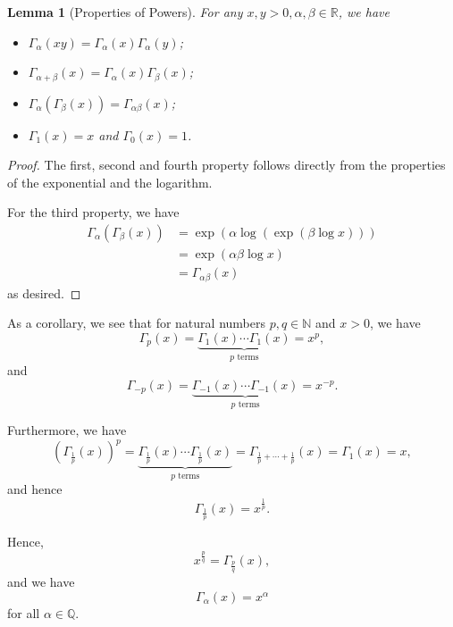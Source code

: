 \documentclass[11pt]{article}
\numberwithin{equation}{section}
\newtheorem{lemma}[theorem]{Lemma}
\theoremstyle{definition}
\theoremstyle{remark}
\newcommand{\pqty}[1]{\left(#1\right)}
\newcommand{\flatfrac}[2]{\frac{#1}{#2}}
\newcommand{\RR}{\mathbb R}
\newcommand{\NN}{\mathbb N}
\newcommand{\QQ}{\mathbb Q}
\begin{document}
\begin{lemma}[Properties of Powers]\label{analysis-unit-0226}
    \label{lem:properties-power}%
    For any \(x, y > 0, \alpha, \beta \in \RR\), we have
    \begin{itemize}
        \item \(\Gamma_\alpha \pqty{xy} = \Gamma_\alpha \pqty{x} \Gamma_\alpha \pqty{y}\);
        \item \(\Gamma_{\alpha + \beta} \pqty{x} = \Gamma_\alpha \pqty{x} \Gamma_\beta \pqty{x}\);
        \item \(\Gamma_\alpha \pqty{\Gamma_\beta \pqty{x}} = \Gamma_{\alpha \beta} \pqty{x}\);
        \item \(\Gamma_1\pqty{x} = x\) and \(\Gamma_0 \pqty{x} = 1\).
    \end{itemize}
\end{lemma}

\begin{proof}
    The first, second and fourth property follows directly from the properties of the exponential and the logarithm.

    For the third property, we have
    \begin{align*}
        \Gamma_\alpha \pqty{\Gamma_\beta \pqty{x}} &= \exp\pqty{\alpha \log\pqty{\exp \pqty{\beta \log x}}} \\
        &= \exp\pqty{\alpha \beta \log x} \\
        &= \Gamma_{\alpha \beta} \pqty{x}
    \end{align*}
    as desired.
\end{proof}

As a corollary, we see that for natural numbers \(p, q \in \NN\) and \(x > 0\), we have
\[
    \Gamma_p \pqty{x} = \underbrace{\Gamma_1 \pqty{x} \cdots \Gamma_1 \pqty{x}}_{p \text{ terms}} = x^p,
\]
and
\[
    \Gamma_{-p} \pqty{x} = \underbrace{\Gamma_{-1} \pqty{x} \cdots \Gamma_{-1} \pqty{x}}_{p \text{ terms}} = x^{-p}.
\]

Furthermore, we have
\[
    \pqty{\Gamma_{\flatfrac{1}{p}} \pqty{x}}^{p} = \underbrace{\Gamma_{\flatfrac{1}{p}} \pqty{x} \cdots \Gamma_{\flatfrac{1}{p}} \pqty{x}}_{p \text{ terms}} = \Gamma_{\flatfrac{1}{p} + \cdots + \flatfrac{1}{p}} \pqty{x} = \Gamma_1 \pqty{x} = x,
\]
and hence
\[
    \Gamma_{\flatfrac{1}{p}} \pqty{x} = x^{\flatfrac{1}{p}}.
\]

Hence,
\[
    x^{\flatfrac{p}{q}} = \Gamma_{\flatfrac{p}{q}} \pqty{x},
\]
and we have
\[
    \Gamma_{\alpha} \pqty{x} = x^\alpha
\]
for all \(\alpha \in \QQ\).
\end{document}
